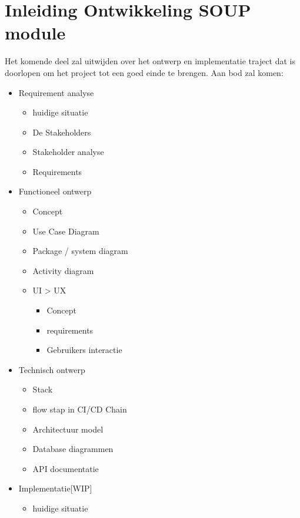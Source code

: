 
\chapter{Inleiding Ontwikkeling SOUP module} %

\label{ch:examples} %

Het komende deel zal uitwijden over het ontwerp en implementatie traject dat is doorlopen om het project tot een goed einde te brengen. Aan bod zal komen:
\begin{itemize}
  \item Requirement analyse
  \begin{itemize}
    \item huidige situatie
    \item De Stakeholders
    \item Stakeholder analyse
    \item Requirements
  \end{itemize}
  \item Functioneel ontwerp
  \begin{itemize}
    \item Concept
    \item Use Case Diagram
    \item Package / system diagram
    \item Activity diagram
    \item UI > UX
    \begin{itemize}
      \item Concept
      \item requirements
      \item Gebruikers interactie
    \end{itemize}
  \end{itemize}
  \item Technisch ontwerp
  \begin{itemize}
    \item Stack
    \item flow stap in CI/CD Chain
    \item Architectuur model
    \item Database diagrammen
    \item API documentatie
  \end{itemize}
  \item Implementatie[WIP]
  \begin{itemize}
    \item huidige situatie

\end{itemize}
\end{itemize}
